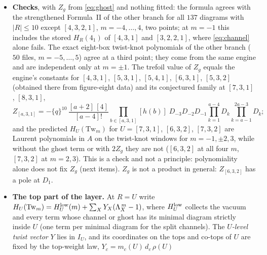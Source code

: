 \documentclass[11pt]{article}
\newcommand{\Tw}{\mathrm{Tw}}
\newcommand{\Lam}{\Lambda}
\begin{document}
\begin{itemize}
Checked: the exact count against the characters on all $355$ diagrams up to $15$ boxes and at two seeds up to $12$; the
three-row formulas on all $217$ three-row diagrams computed in these regimes (up to $30$ boxes), with $39$ values written
down before they were computed ($36$ three-row, $3$ four-corner) all correct, while one more guess, at
$(s_1,s_2,s_3)=(6,4,4)$, failed; the leading vector, found on the $30$ three-corner ghost diagrams up to $13$ boxes, on
$11$ more at $14$--$15$ boxes and at a second point on $11$ diagrams up to $19$ boxes, with a sign-flipped control; the
depth profiles at two seeds.  Not closed: $\mathrm{ex}(U)$ for four or more corners and for three rows with
$s_3\ge4$ and $\min(s_1,s_2)=3$ or $s_3\ge5$, a basis of the ghost space below the top piece, and the ghost coefficients
below the leading part.
\item \textbf{Checks}, with $Z_g$ from \eqref{eq:ghost} and nothing fitted: the formula agrees with the strengthened
Formula~II of the other branch for all $137$ diagrams with $|R|\le10$ except $[4,3,2,1]$, $m=-4,\dots,4$, two points; at
$m=-1$ this includes the stored $H_R(4_1)$ of $[4,3,1]$ and $[3,2,2,1]$, where \eqref{eq:channel} alone fails.  The
exact eight-box twist-knot polynomials of the other branch ($50$ files, $m=-5,\dots,5$) agree at a third point; they come
from the same engine and are independent only at $m=\pm1$.  The trefoil value of $Z_g$ equals the engine's
constants for $[4,3,1]$, $[5,3,1]$, $[5,4,1]$, $[6,3,1]$, $[5,3,2]$ (obtained there from figure-eight data) and its
conjectured family at $[7,3,1]$, $[8,3,1]$,
\[
Z_{[a,3,1]}=-\{q\}^{10}\,\frac{[a+2]\,[4]}{[a-4]!}\prod_{b\in[a,3,1]}[h(b)]\;D_{-3}D_{-2}D_{-1}\prod_{k=1}^{a-4}D_k
\prod_{k=a-1}^{2a-3}D_k ;
\]
and the predicted $H_U(\Tw_m)$ for $U=[7,3,1]$, $[6,3,2]$, $[7,3,2]$ are Laurent polynomials in $A$ on the twist-knot
windows for $m=-1,\pm2,3$, while without the ghost term or with $2Z_g$ they are not ($[6,3,2]$ at all four $m$,
$[7,3,2]$ at $m=2,3$).  This is a check and not a principle: polynomiality alone does not fix $Z_g$ (next items).  $Z_g$
is not a product in general: $Z_{[6,3,2]}$ has a pole at $D_1$.
\item \textbf{The top part of the layer.}  At $R=U$ write $H_U(\Tw_m)=H^{\rm low}_U(m)+\sum_XY_X(\Lam_X^{\,m}-1)$, where
$H^{\rm low}_U$ collects the vacuum and every term whose channel or ghost has its minimal diagram strictly inside $U$
(one term per minimal diagram for the split channels).  The \emph{$U$-level twist vector} $Y$ lies in $I_U$, and its
coordinates on the tops and co-tops of $U$ are fixed by the top-weight law, $Y_c=m_c(U)\,d_c\,\rho(U)$

\end{itemize}
\end{document}
